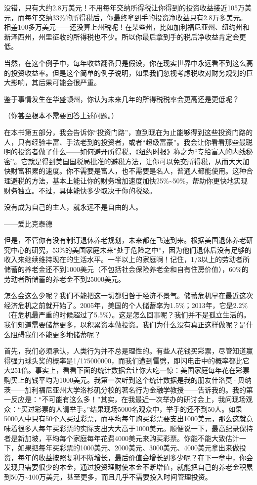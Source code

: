 没错，只有大约2.8万美元！不用每年交纳所得税让你得到的投资收益接近105万美元，而每年交纳33\%的所得税后，你最终拿到手的投资净收益只有2.8万多美元。相差100多万美元——还没算上州税呢！在某些州，比如加利福尼亚州、纽约州和新泽西州，州里征收的所得税也不少。所以你最后拿到手的税后净收益肯定会更低。

当然，在这个例子中，每年收益翻番只是假设，你在现实世界中永远看不到这么高的投资收益率。但是这个简单的例子说明，如果我们忽视考虑税收对财务规划的巨大影响，其后果可能会很严重。

鉴于事情发生在华盛顿州，你认为未来几年的所得税税率会更高还是更低呢？

（你甚至根本不需要回答上述问题。）

在本书第五部分，我会告诉你“投资门路”，直到现在为止能够得到这些投资门路的人，只有经验丰富、手法老到的投资者，或者“超级富豪”。我会让你看看那些最聪明的投资者做了什么——如何避开所得税，《纽约时报》称之为“专给富人的内线秘密”。它就是得到美国国税局批准的避税方法，让你可以免交所得税，从而大大加快财富积累的速度。你不需要是富人，也不需要是名人，普通人都能使用。这种合理避税的方法，基本上能让你的财务增加速度加快25\%\textasciitilde{}50\%，帮助你更快地实现财务独立。不过，具体能快多少取决于你的税级。

\begin{BookQuote}
没有成为自己的主人，就永远不是自由的人。

\hfill ——爱比克泰德
\end{BookQuote}

但是，不管你有没有制订退休养老规划，未来都在飞速到来。根据美国退休养老研究中心的研究，53\%的美国家庭未来“处于危险之中”，因为他们退休后没有足够的收入来继续维持现在的生活水平。一半以上的家庭啊！记住，1/3以上的劳动者所储蓄的养老金还不到1000美元（不包括社会保险养老金和自有住房价值），60\%的劳动者所储蓄的养老金不到25000美元。

怎么会这么少呢？我们不能把这一切都归咎于经济不景气。储蓄危机早在最近这次经济危机之前就开始了。2005年，美国的个人储蓄率为1.5\%；2013年，它是2.2\%（在危机最严重的时候超过了5.5\%）。这是怎么回事呢？我们并不是孤立生活的。我们知道需要储蓄更多，以积累资本做投资。我们为什么没有真正这样做呢？是什么阻碍我们不能更多地储蓄呢？

首先，我们必须承认，人类行为并不总是理性的。有些人花钱买彩票，尽管知道赢得强力球头奖的概率是1/175000000，而我们遭到雷劈，即闪电击中的概率都比它大251倍。事实上，看看下面的统计数据会让你大吃一惊：美国家庭每年花在彩票购买上的钱平均为1000美元。我第一次听到这个统计数据是我的朋友什洛莫·贝纳茨——加利福尼亚州大学洛杉矶分校的著名行为金融学教授——告诉我的。我的第一反应是：“不可能有这么多！”其实，在我最近一次举办的研讨会上，我问现场观众：“买过彩票的人请举手。”结果现场5000名观众中，举手的还不到50人。如果5000人中只有50个人买过彩票，而平均每年购买彩票要支出1000美元，那么这就意味着很多人每年买彩票的实际支出大大高于1000美元。顺便说一下，最高纪录保持者是新加坡，平均每个家庭每年花费4000美元来购买彩票。你能不能大致估计一下，如果把每年买彩票的1000美元、2000美元、3000美元、4000美元拿出来做投资，每年的收益按照复利不断增长，最后价值会增长到多少呢？在下一章中，你会发现只需要很少的本金，通过投资理财使本金不断增值，就能把自己的养老金积累到50万\textasciitilde{}100万美元，甚至更多，而且几乎不需要投入时间管理投资。


